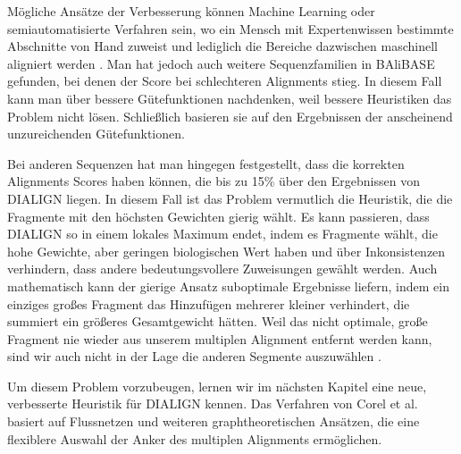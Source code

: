 Mögliche Ansätze der Verbesserung können Machine Learning oder semiautomatisierte Verfahren sein, wo ein Mensch mit Expertenwissen bestimmte Abschnitte von Hand zuweist und lediglich die Bereiche dazwischen maschinell aligniert werden \cite{mpps06}. Man hat jedoch auch weitere Sequenzfamilien in BAliBASE gefunden, bei denen der Score bei schlechteren Alignments stieg. In diesem Fall kann man über bessere Gütefunktionen nachdenken, weil bessere Heuristiken das Problem nicht lösen. Schließlich basieren sie auf den Ergebnissen der anscheinend unzureichenden Gütefunktionen.

Bei anderen Sequenzen hat man hingegen festgestellt, dass die korrekten Alignments Scores haben können, die bis zu 15\% über den Ergebnissen von DIALIGN liegen. In diesem Fall ist das Problem vermutlich die Heuristik, die die Fragmente mit den höchsten Gewichten gierig wählt. Es kann passieren, dass DIALIGN so in einem lokales Maximum endet, indem es Fragmente wählt, die hohe Gewichte, aber geringen biologischen Wert haben und über Inkonsistenzen verhindern, dass andere bedeutungsvollere Zuweisungen gewählt werden. Auch mathematisch kann der gierige Ansatz suboptimale Ergebnisse liefern, indem ein einziges großes Fragment das Hinzufügen mehrerer kleiner verhindert, die summiert ein größeres Gesamtgewicht hätten. Weil das nicht optimale, große Fragment nie wieder aus unserem multiplen Alignment entfernt werden kann, sind wir auch nicht in der Lage die anderen Segmente auszuwählen \cite{m99}. 

Um diesem Problem vorzubeugen, lernen wir im nächsten Kapitel eine neue, verbesserte Heuristik für DIALIGN kennen. Das Verfahren von Corel et al. basiert auf Flussnetzen und weiteren graphtheoretischen Ansätzen, die eine flexiblere Auswahl der Anker des multiplen Alignments ermöglichen\cite{cpm10}.